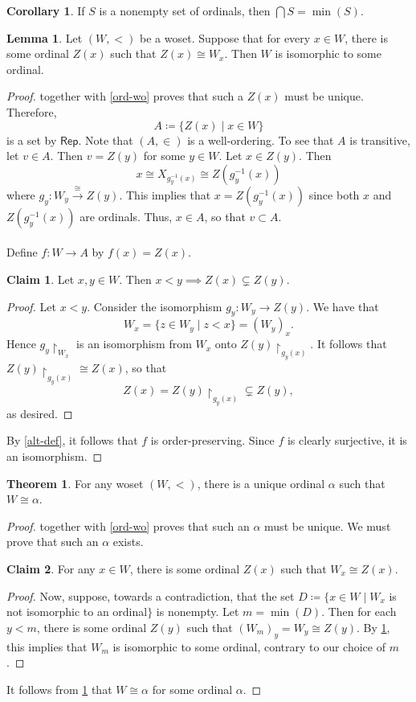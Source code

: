 \documentclass[10pt,letterpaper,cm]{nupset}
\theoremstyle{definition}
\theoremstyle{theorem}
\newtheorem{theorem}[definition]{Theorem}
\newtheorem{lemma}[definition]{Lemma}
\newtheorem{corollary}[definition]{Corollary}
\newtheorem*{claim}{Claim}
\theoremstyle{remark}
\newcommand{\1}{\mathbf{1}}
\newcommand{\0}{\vec 0}
\begin{document}
\begin{corollary}
If $S$ is a nonempty set of ordinals, then  $\bigcap{S} = \min(S)$.
\end{corollary}

\begin{lemma}\label{PL}
Let $(W, <)$ be a woset. Suppose that for every $x\in W$, there is some ordinal $Z(x)$ such that $Z(x) \cong W_x$. Then $W$ is isomorphic to some ordinal. 
\end{lemma}
\begin{proof}
 together with \cref{ord-wo} proves that such a $Z(x)$ must be unique. Therefore, $$A\coloneqq \{Z(x) \mid x \in W\}$$ is a set by $\mathsf{Rep}$. Note that $(A, \in)$ is a well-ordering. To see that $A$ is transitive, let $v\in A$. Then $v = Z(y)$ for some $y\in W$. Let $x\in Z(y)$. Then $$ x \cong X_{g_y^{-1}(x)} \cong Z(g^{-1}_y(x))    $$ where $g_y : W_y \overset{\cong}{\longrightarrow} Z(y)$.  This implies that $x = Z(g^{-1}_y(x))$ since both $x$ and $Z(g^{-1}_y(x))$ are ordinals. Thus, $x \in A$, so that $v\subset A$.
\\ \\
Define $f : W \to A$ by $f(x) = Z(x)$. 
\begin{claim} 
Let $x,y\in W$. Then $x <y \implies Z(x) \subsetneq Z(y)$. 
\end{claim}
\begin{proof}
Let $x<y$. Consider the isomorphism $g_y : W_y \to Z(y)$. We have that $$W_x = \{z\in W_y \mid  z < x\} = (W_y)_x.$$ Hence $g_y\restriction_{W_x}$ is an isomorphism from $W_x$ onto $Z(y)\restriction_{g_y(x)}$. It follows that $Z(y)\restriction_{g_y(x)} \cong Z(x)$, so that $$Z(x) = Z(y)\restriction_{g_y(x)} \subsetneq Z(y),$$ as desired. 
\end{proof}
By \cref{alt-def}, it follows that $f$ is order-preserving. Since $f$ is clearly surjective, it is an isomorphism.
\end{proof}

\begin{theorem} 
For any woset $(W, <)$, there is a unique ordinal $\alpha$ such that $W \cong \alpha$.
\end{theorem}
\begin{proof}
 together with \cref{ord-wo} proves that such an $\alpha$ must be unique. We must prove that such an $\alpha$ exists.
\begin{claim}
For any $x\in W$, there is some ordinal $Z(x)$ such that $W_x \cong Z(x)$.
\end{claim}
\begin{proof}
Now, suppose, towards a contradiction, that the set $D\coloneqq \{ x\in W \mid W_x$ is not isomorphic to an ordinal$\}$ is nonempty.   Let $m = \min(D)$. Then for each $y< m$, there is some ordinal $Z(y)$ such that $(W_m)_y = W_y \cong Z(y)$.  By \cref{PL}, this implies that $W_m$ is isomorphic to some ordinal, contrary to our choice of $m$.
\end{proof}It follows from \cref{PL} that $W \cong \alpha$ for some ordinal $\alpha$.
\end{proof}
\end{document}
